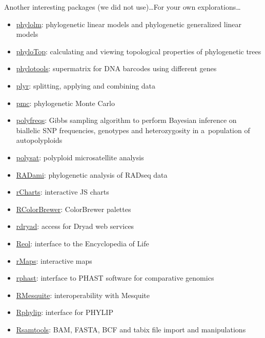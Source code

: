 \documentclass[compress, ucs, xelatex, 11pt, xcolor=svgnames,
  hyperref={
    bookmarks=true,
    unicode=true,
    colorlinks=true,
    pdftitle={Molecular data in R},
    plainpages=false,
    pdfauthor={Vojtech Zeisek},
    pdfsubject={Course about phylogeny and evolution in R},
    pdfcreator={XeLaTeX},
    pdfkeywords={R, evolution, phylogeny, molecular data},
    linkcolor=Tomato,
    anchorcolor=SaddleBrown,
    citecolor=Goldenrod,
    filecolor=DarkMagenta,
    menucolor=Sienna,
    urlcolor=DarkTurquoise,
    pdftex},
  url={hyphens, lowtilde} %
  ]{beamer}
\begin{document}
\begin{frame}[allowframebreaks]{Another interesting packages (we did not use)\ldots}{For your own explorations\ldots}
\begin{itemize}
    \item \href{https://CRAN.R-project.org/package=phylolm}{phylolm}: phylogenetic linear models and phylogenetic generalized linear models
    \item \href{https://CRAN.R-project.org/package=phyloTop}{phyloTop}: calculating and viewing topological properties of phylogenetic trees
    \item \href{https://CRAN.R-project.org/package=phylotools}{phylotools}: supermatrix for DNA barcodes using different genes
    \item \href{https://CRAN.R-project.org/package=plyr}{plyr}: splitting, applying and combining data
    \item \href{https://CRAN.R-project.org/package=pmc}{pmc}: phylogenetic Monte Carlo
    \item \href{https://CRAN.R-project.org/package=polyfreqs}{polyfreqs}: Gibbs sampling algorithm to perform Bayesian inference on biallelic SNP frequencies, genotypes and heterozygosity in a~population of autopolyploids
    \item \href{https://CRAN.R-project.org/package=polysat}{polysat}: polyploid microsatellite analysis
    \item \href{https://CRAN.R-project.org/package=RADami}{RADami}: phylogenetic analysis of RADseq data
    \item \href{https://github.com/ramnathv/rCharts}{rCharts}: interactive JS charts
    \item \href{https://CRAN.R-project.org/package=RColorBrewer}{RColorBrewer}: ColorBrewer palettes
    \item \href{https://CRAN.R-project.org/package=rdryad}{rdryad}: access for Dryad web services
    \item \href{https://CRAN.R-project.org/package=Reol}{Reol}: interface to the Encyclopedia of Life
    \item \href{https://github.com/ramnathv/rMaps}{rMaps}: interactive maps
    \item \href{https://CRAN.R-project.org/package=rphast}{rphast}: interface to PHAST software for comparative genomics
    \item \href{https://r-forge.r-project.org/projects/rmesquite/}{RMesquite}: interoperability with Mesquite
    \item \href{https://CRAN.R-project.org/package=Rphylip}{Rphylip}: interface for PHYLIP
    \item \href{https://bioconductor.org/packages/release/bioc/html/Rsamtools.html}{Rsamtools}: BAM, FASTA, BCF and tabix file import and manipulations

\end{itemize}
\end{frame}
\end{document}
